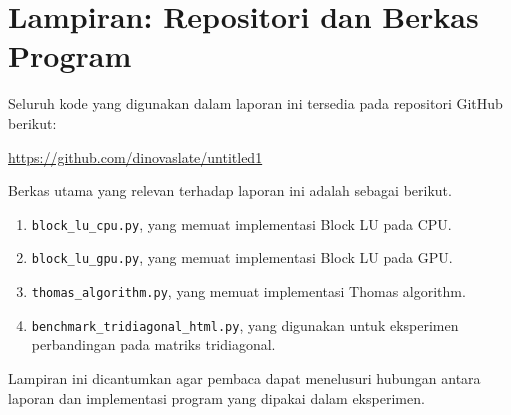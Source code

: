 \documentclass[12pt,a4paper]{article}
\begin{document}
\appendix
\section{Lampiran: Repositori dan Berkas Program}
Seluruh kode yang digunakan dalam laporan ini tersedia pada repositori GitHub berikut:
\begin{center}
\url{https://github.com/dinovaslate/untitled1}
\end{center}

Berkas utama yang relevan terhadap laporan ini adalah sebagai berikut.
\begin{enumerate}[leftmargin=1.5em]
  \item \texttt{block\_lu\_cpu.py}, yang memuat implementasi Block LU pada CPU.
  \item \texttt{block\_lu\_gpu.py}, yang memuat implementasi Block LU pada GPU.
  \item \texttt{thomas\_algorithm.py}, yang memuat implementasi Thomas algorithm.
  \item \texttt{benchmark\_tridiagonal\_html.py}, yang digunakan untuk eksperimen perbandingan pada matriks tridiagonal.
\end{enumerate}

Lampiran ini dicantumkan agar pembaca dapat menelusuri hubungan antara laporan dan implementasi program yang dipakai dalam eksperimen.
\end{document}
